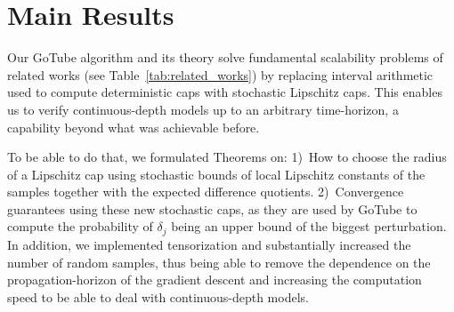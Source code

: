 \documentclass[letterpaper]{article} %
\newcommand{\rd}{\delta}
\begin{document}

\section{Main Results}
Our GoTube algorithm and its theory solve fundamental scalability problems of related works (see Table~\ref{tab:related_works}) by replacing interval arithmetic used to compute deterministic caps with stochastic Lipschitz caps. This enables us to verify continuous-depth models up to an arbitrary time-horizon, a capability beyond what was achievable before.

To be able to do that, we formulated Theorems on: 1)~How to choose the radius of a Lipschitz cap using stochastic bounds of local Lipschitz constants of the samples together with the expected difference quotients. 2)~Convergence guarantees using these new stochastic caps, as they are used by GoTube to compute the probability of $\rd_j$ being an upper bound of the biggest perturbation.
In addition, we implemented tensorization and substantially increased the number of random samples, thus being able to remove the dependence on the propagation-horizon of the gradient descent and increasing the computation speed to be able to deal with continuous-depth models.
\end{document}
